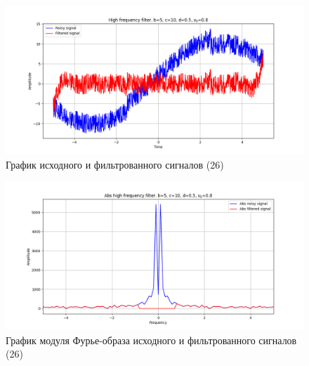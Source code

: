 \documentclass[a4paper, 12pt]{article}
\begin{document}
    \begin{figure}[!htb]
        \centering
        \includegraphics[scale=0.48]{26_u_flt_u_nolow.png}
        \captionsetup{skip=0pt}
        \caption{График исходного и фильтрованного сигналов (26)}
        \label{fig:fig_323234}
    \end{figure}
    \begin{figure}[!htb]
        \centering
        \includegraphics[scale=0.48]{26_abs_u_U_nolow.png}
        \captionsetup{skip=0pt}
        \caption{График модуля Фурье-образа исходного и фильтрованного сигналов (26)}
        \label{fig:fig_56456}
    \end{figure}
\end{document}
